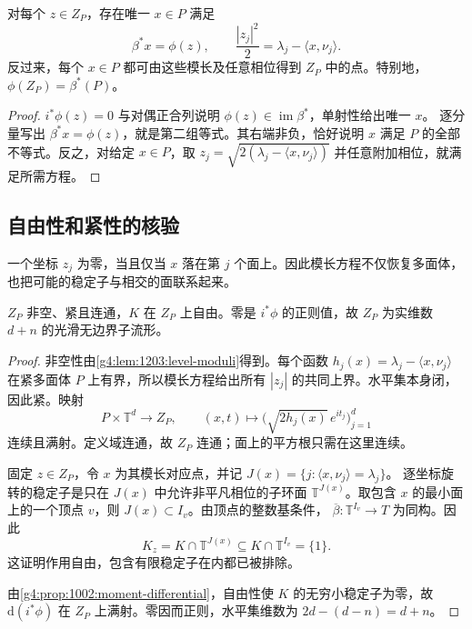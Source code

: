 \begin{lemma}\label{g4:lem:1203:level-moduli}
	对每个 \(z\in Z_P\)，存在唯一 \(x\in P\) 满足
	\begin{equation}\label{g4:eq:1203:moduli-equations}
		\beta^*x=\phi(z),\qquad
		\frac{|z_j|^2}{2}=\lambda_j-\langle x,\nu_j\rangle.
	\end{equation}
	反过来，每个 \(x\in P\) 都可由这些模长及任意相位得到 \(Z_P\) 中的点。特别地，\(\phi(Z_P)=\beta^*(P)\)。
\end{lemma}
\begin{proof}
	\(i^*\phi(z)=0\) 与对偶正合列说明
	\(\phi(z)\in\operatorname{im}\beta^*\)，单射性给出唯一 \(x\)。
	逐分量写出 \(\beta^*x=\phi(z)\)，就是第二组等式。其右端非负，恰好说明 \(x\) 满足 \(P\) 的全部不等式。反之，对给定 \(x\in P\)，取
	\(z_j=\sqrt{2(\lambda_j-\langle x,\nu_j\rangle)}\)
	并任意附加相位，就满足所需方程。
\end{proof}

\subsection{自由性和紧性的核验}
\label{g4:subsec:1203:03}

一个坐标 \(z_j\) 为零，当且仅当 \(x\) 落在第 \(j\) 个面上。因此模长方程不仅恢复多面体，也把可能的稳定子与相交的面联系起来。

\begin{proposition}\label{g4:prop:1203:free-compact-level}
	\(Z_P\) 非空、紧且连通，\(K\) 在 \(Z_P\) 上自由。零是 \(i^*\phi\) 的正则值，故 \(Z_P\) 为实维数 \(d+n\) 的光滑无边界子流形。
\end{proposition}
\begin{proof}
	非空性由\cref{g4:lem:1203:level-moduli}得到。每个函数
	\(h_j(x)=\lambda_j-\langle x,\nu_j\rangle\) 在紧多面体 \(P\) 上有界，所以模长方程给出所有 \(|z_j|\) 的共同上界。水平集本身闭，因此紧。映射
	\[
		P\times\mathbb T^d\longrightarrow Z_P,\qquad
		(x,t)\longmapsto
		\bigl(\sqrt{2h_j(x)}\,e^{it_j}\bigr)_{j=1}^d
	\]
	连续且满射。定义域连通，故 \(Z_P\) 连通；面上的平方根只需在这里连续。

	固定 \(z\in Z_P\)，令 \(x\) 为其模长对应点，并记
	\(J(x)=\{j:\langle x,\nu_j\rangle=\lambda_j\}\)。
	逐坐标旋转的稳定子是只在 \(J(x)\) 中允许非平凡相位的子环面 \(\mathbb T^{J(x)}\)。取包含 \(x\) 的最小面上的一个顶点 \(v\)，则 \(J(x)\subset I_v\)。由顶点的整数基条件，
	\(\overline\beta:\mathbb T^{I_v}\to T\)
	为同构。因此
	\[
		K_z=K\cap\mathbb T^{J(x)}
		\subseteq K\cap\mathbb T^{I_v}=\{1\}.
	\]
	这证明作用自由，包含有限稳定子在内都已被排除。

	由\cref{g4:prop:1002:moment-differential}，自由性使 \(K\) 的无穷小稳定子为零，故 \(\mathrm{d}(i^*\phi)\) 在 \(Z_P\) 上满射。零因而正则，水平集维数为
	\(2d-(d-n)=d+n\)。
\end{proof}

